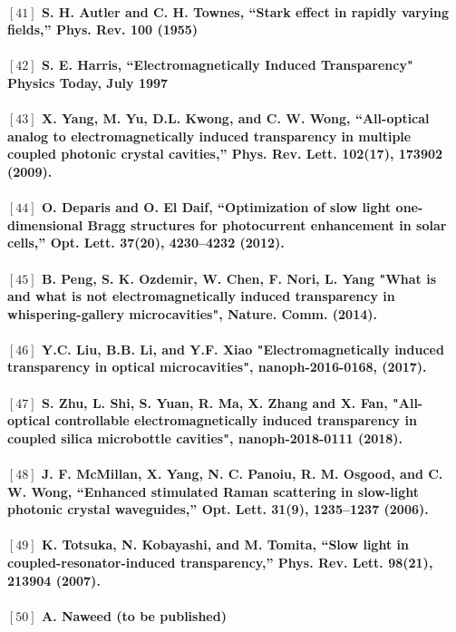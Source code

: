 \paragraph{\normalfont \large $[41]$ S. H. Autler and C. H. Townes, “Stark effect in rapidly varying fields,” Phys. Rev. \textbf{100} (1955) \\ 
\\$[42]$ S. E. Harris, “Electromagnetically Induced Transparency" Physics Today, July 1997 \\
\\$[43]$ X. Yang, M. Yu, D.L. Kwong, and C. W. Wong, “All-optical analog to electromagnetically induced
transparency in multiple coupled photonic crystal cavities,” Phys. Rev. Lett. \textbf{102}(17), 173902 (2009). \\
\\$[44]$  O. Deparis and O. El Daif, “Optimization of slow light one-dimensional Bragg structures for photocurrent
enhancement in solar cells,” Opt. Lett. \textbf{37}(20), 4230–4232 (2012).\\
\\ $[45]$ B. Peng, S. K. Ozdemir, W. Chen, F. Nori, L. Yang "What is and what is not electromagnetically induced transparency in whispering-gallery microcavities", Nature. Comm. (2014).\\
\\ $[46]$ Y.C. Liu, B.B. Li, and Y.F. Xiao "Electromagnetically induced transparency in optical microcavities", nanoph-2016-0168, (2017).\\
\\ $[47]$ S. Zhu, L. Shi, S. Yuan, R. Ma, X. Zhang and X. Fan, "All-optical controllable electromagnetically induced transparency in coupled silica microbottle cavities", nanoph-2018-0111 (2018).\\
\\ $[48]$ J. F. McMillan, X. Yang, N. C. Panoiu, R. M. Osgood, and C. W. Wong, “Enhanced stimulated Raman scattering
in slow-light photonic crystal waveguides,” Opt. Lett. \textbf{31}(9), 1235–1237 (2006).\\
\\ $[49]$ K. Totsuka, N. Kobayashi, and M. Tomita, “Slow light in coupled-resonator-induced transparency,” Phys. Rev.
Lett. \textbf{98}(21), 213904 (2007).\\
\\ $[50]$ A. Naweed (to be published)}

